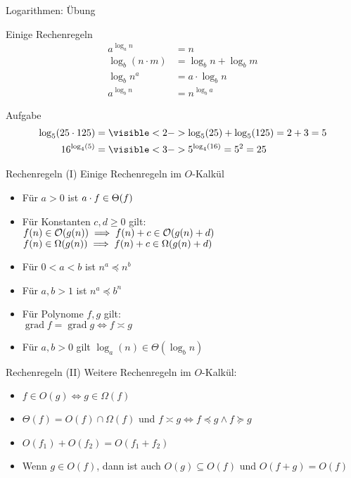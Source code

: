 \begin{frame}{Logarithmen: Übung}
	\begin{block}{Einige Rechenregeln}
		\begin{align*}
			a^{\log_a n} &= n\\
			\log_b (n \cdot m) &= \log_b n + \log_b m\\ 
			\log_b n^a &= a \cdot \log_b n\\
			a^{\log_b n} &= n^{\log_b a}
		\end{align*}
	\end{block}

	\begin{block}{Aufgabe}
		\begin{align*}
			\log_5(25 \cdot 125) &= \visible<2->{\log_5(25) + \log_5(125) = 2+3 = 5}\\
			16^{\log_4(5)} &= \visible<3->{5^{\log_4(16)} = 5^2 = 25}
		\end{align*}
	\end{block}
\end{frame}

\begin{frame}{Rechenregeln (I)}
	Einige Rechenregeln im $O$-Kalkül
	\begin{itemize}[<+->]
		\item Für $a > 0$ ist $a \cdot f \in \Theta\!\left(f\right)$ 
		\item Für Konstanten $c, d \geq 0$ gilt: \\ 
			\quad $f(n) \in \Oh{g(n)} \Impl f(n) + c \in \Oh{g(n) + d}$ \\
			\quad $f(n) \in \Om{g(n)} \Impl f(n) + c \in \Om{g(n) + d}$ \\
		\item Für $0 < a < b$ ist $n^a \preceq n^b$
		\item Für $a,b > 1$ ist $n^a \preceq b^n$ 
		\item Für Polynome $f,g$ gilt: \\
			\quad $\mathop{\text{grad}} f = \mathop{\text{grad}} g \iff f \asymp g $
		\item Für $a,b > 0$ gilt $\log_a(n) \in \Theta(\log_b n)$
		
	\end{itemize}
\end{frame}


\begin{frame}{Rechenregeln (II)}
	Weitere Rechenregeln im $O$-Kalkül:
	\begin{itemize}[<+->]
		\item $f \in O(g) \iff g \in \Omega(f)$
		\item $\Theta(f) = O(f) \cap \Omega(f)$ und $f \asymp g \iff f \preceq g \wedge f \succeq g$ 
		\item $O(f_1) + O(f_2) = O(f_1 + f_2)$
		\item Wenn $g \in O(f)$, dann ist auch $O(g) \subseteq O(f)$ und $O(f + g) = O(f)$
	\end{itemize}
	
\end{frame}


